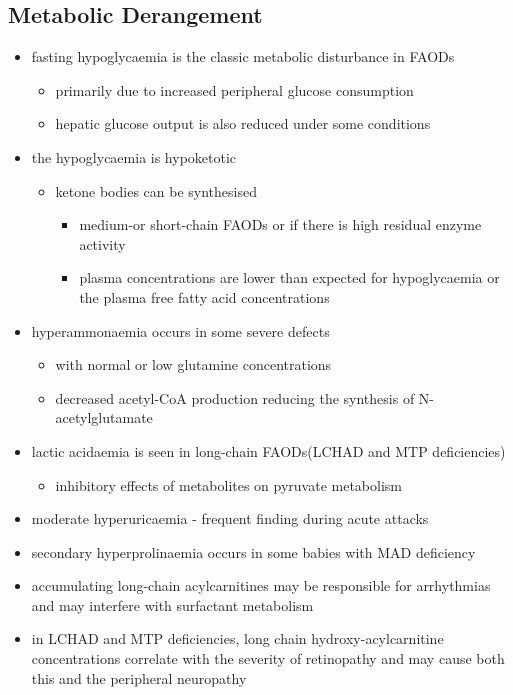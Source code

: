 \documentclass{scrartcl}
\begin{document}
\subsection{Metabolic Derangement}
\label{sec:orgab21edc}
\begin{itemize}
\item fasting hypoglycaemia is the classic metabolic disturbance in FAODs
\begin{itemize}
\item primarily due to increased peripheral glucose consumption
\item hepatic glucose output is also reduced under some conditions
\end{itemize}
\item the hypoglycaemia is hypoketotic
\begin{itemize}
\item ketone bodies can be synthesised
\begin{itemize}
\item medium-or short-chain FAODs or if there is high residual enzyme activity
\item plasma concentrations are lower than expected for hypoglycaemia or the plasma free fatty acid concentrations
\end{itemize}
\end{itemize}
\item hyperammonaemia occurs in some severe defects
\begin{itemize}
\item with normal or low glutamine concentrations
\item decreased acetyl-CoA production reducing the synthesis of N-acetylglutamate
\end{itemize}
\item lactic acidaemia is seen in long-chain FAODs(LCHAD and MTP deficiencies)
\begin{itemize}
\item inhibitory effects of metabolites on pyruvate metabolism
\end{itemize}
\item moderate hyperuricaemia - frequent finding during acute attacks
\item secondary hyperprolinaemia occurs in some babies with MAD deficiency
\item accumulating long-chain acylcarnitines may be responsible for
arrhythmias and may interfere with surfactant metabolism
\item in LCHAD and MTP deficiencies, long chain hydroxy-acylcarnitine
concentrations correlate with the severity of retinopathy and may
cause both this and the peripheral neuropathy
\end{itemize}
\end{document}
